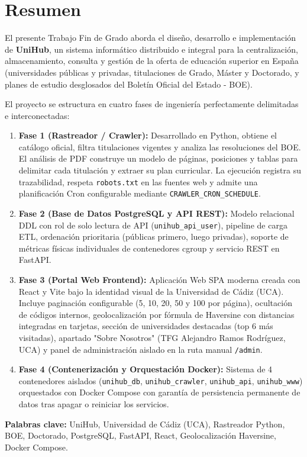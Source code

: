 \newpage{\ }
\thispagestyle{empty}
\chapter*{Resumen}

\noindent El presente Trabajo Fin de Grado aborda el diseño, desarrollo e implementación de \textbf{UniHub}, un sistema informático distribuido e integral para la centralización, almacenamiento, consulta y gestión de la oferta de educación superior en España (universidades públicas y privadas, titulaciones de Grado, Máster y Doctorado, y planes de estudio desglosados del Boletín Oficial del Estado - BOE).

El proyecto se estructura en cuatro fases de ingeniería perfectamente delimitadas e interconectadas:
\begin{enumerate}
    \item \textbf{Fase 1 (Rastreador / Crawler):} Desarrollado en Python, obtiene el catálogo oficial, filtra titulaciones vigentes y analiza las resoluciones del BOE. El análisis de PDF construye un modelo de páginas, posiciones y tablas para delimitar cada titulación y extraer su plan curricular. La ejecución registra su trazabilidad, respeta \texttt{robots.txt} en las fuentes web y admite una planificación Cron configurable mediante \texttt{CRAWLER\_CRON\_SCHEDULE}.
    \item \textbf{Fase 2 (Base de Datos PostgreSQL y API REST):} Modelo relacional DDL con rol de solo lectura de API (\texttt{unihub\_api\_user}), pipeline de carga ETL, ordenación prioritaria (públicas primero, luego privadas), soporte de métricas físicas individuales de contenedores cgroup y servicio REST en FastAPI.
    \item \textbf{Fase 3 (Portal Web Frontend):} Aplicación Web SPA moderna creada con React y Vite bajo la identidad visual de la Universidad de Cádiz (UCA). Incluye paginación configurable (5, 10, 20, 50 y 100 por página), ocultación de códigos internos, geolocalización por fórmula de Haversine con distancias integradas en tarjetas, sección de universidades destacadas (top 6 más visitadas), apartado "Sobre Nosotros" (TFG Alejandro Ramos Rodríguez, UCA) y panel de administración aislado en la ruta manual \texttt{/admin}.
    \item \textbf{Fase 4 (Contenerización y Orquestación Docker):} Sistema de 4 contenedores aislados (\texttt{unihub\_db}, \texttt{unihub\_crawler}, \texttt{unihub\_api}, \texttt{unihub\_www}) orquestados con Docker Compose con garantía de persistencia permanente de datos tras apagar o reiniciar los servicios.
\end{enumerate}

\vspace{.5cm}

\noindent \textbf{Palabras clave:} UniHub, Universidad de Cádiz (UCA), Rastreador Python, BOE, Doctorado, PostgreSQL, FastAPI, React, Geolocalización Haversine, Docker Compose.
